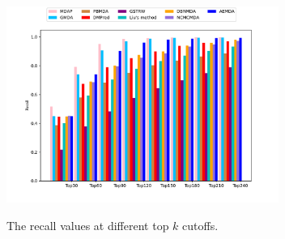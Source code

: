 \documentclass[journal,twoside,web]{ieeecolor}
\begin{document}
\begin{figure}
	\centering
	\includegraphics[width=3.5in]{fig/top_k.pdf}\\
	\caption{The recall values at different top $k$ cutoffs.}
	\label{fig:05}
	\vspace{-0.4cm}
\end{figure}


	
\end{document}
